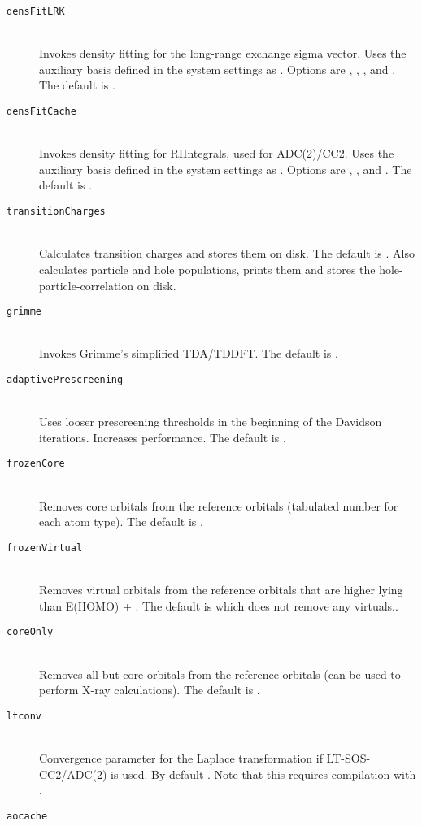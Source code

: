 \begin{description}
    \item[\texttt{densFitLRK}]\hfill\\
    Invokes density fitting for the long-range exchange sigma vector. Uses the auxiliary basis defined in the system settings as .
    Options are , , , and . The default is .
    \item[\texttt{densFitCache}]\hfill\\
    Invokes density fitting for RIIntegrals, used for ADC(2)/CC2. Uses the auxiliary basis defined in the system settings as .
    Options are , , and . The default is .
    \item[\texttt{transitionCharges}]\hfill\\
    Calculates transition charges and stores them on disk. The default is . Also calculates particle and hole populations, prints them and stores the hole-particle-correlation on disk.
    \item[\texttt{grimme}]\hfill\\
    Invokes Grimme's simplified TDA/TDDFT. The default is .
    \item[\texttt{adaptivePrescreening}]\hfill\\
    Uses looser prescreening thresholds in the beginning of the Davidson iterations. Increases performance. The default is .
    \item[\texttt{frozenCore}]\hfill\\
    Removes core orbitals from the reference orbitals (tabulated number for each atom type). The default is .
    \item[\texttt{frozenVirtual}]\hfill\\
    Removes virtual orbitals from the reference orbitals that are higher lying than E(HOMO) + . The default is  which does not remove any virtuals..
    \item[\texttt{coreOnly}]\hfill\\
    Removes all but core orbitals from the reference orbitals (can be used to perform X-ray calculations). The default is .
    \item[\texttt{ltconv}]\hfill \\
	  Convergence parameter for the Laplace transformation if LT-SOS-CC2/ADC(2) is used. By default . Note that this requires compilation with .
    \item[\texttt{aocache}]\hfill \\

\end{description}
